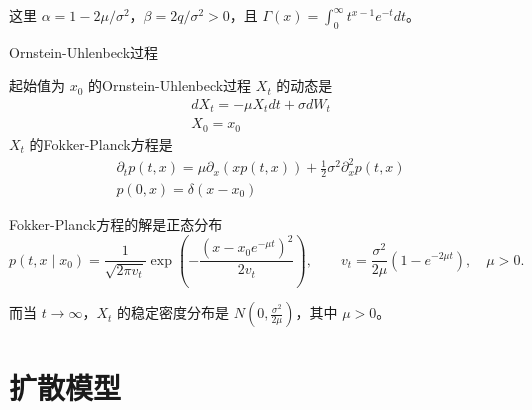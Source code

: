 这里 $\alpha=1-2\mu/\sigma^2$，$\beta=2q/\sigma^2>0$，且 $\Gamma(x)=\int_0^{\infty}t^{x-1}e^{-t}dt$。

Ornstein-Uhlenbeck过程

起始值为 $x_0$ 的Ornstein-Uhlenbeck过程 $X_t$ 的动态是
$$
\begin{gathered}
d X_t=-\mu X_t d t+\sigma d W_t \\
X_0=x_0
\end{gathered}
$$
$X_t$ 的Fokker-Planck方程是
$$
\begin{gathered}
\partial_t p(t, x)=\mu \partial_x(x p(t, x))+\frac{1}{2} \sigma^2 \partial_x^2 p(t, x) \\
p(0, x)=\delta\left(x-x_0\right)
\end{gathered}
$$

Fokker-Planck方程的解是正态分布
$$
p(t,x\mid x_0)=\frac{1}{\sqrt{2\pi v_t}}
\exp\left(-\frac{(x-x_0 e^{-\mu t})^2}{2v_t}\right),
\qquad v_t=\frac{\sigma^2}{2\mu}(1-e^{-2\mu t}),\quad\mu>0.
$$

而当 $t\rightarrow\infty$，$X_t$ 的稳定密度分布是 $N\left(0,\frac{\sigma^2}{2\mu}\right)$，其中 $\mu>0$。





\chapter{扩散模型}

